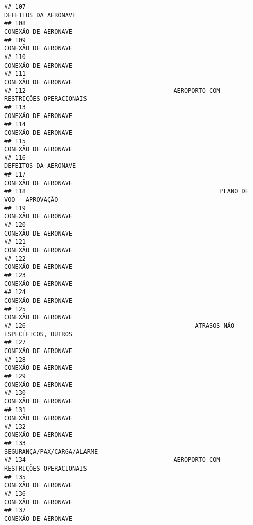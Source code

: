 \documentclass[
]{article}
\begin{document}
\begin{verbatim}
## 107                                                          DEFEITOS DA AERONAVE
## 108                                                           CONEXÃO DE AERONAVE
## 109                                                           CONEXÃO DE AERONAVE
## 110                                                           CONEXÃO DE AERONAVE
## 111                                                           CONEXÃO DE AERONAVE
## 112                                         AEROPORTO COM RESTRIÇÕES OPERACIONAIS
## 113                                                           CONEXÃO DE AERONAVE
## 114                                                           CONEXÃO DE AERONAVE
## 115                                                           CONEXÃO DE AERONAVE
## 116                                                          DEFEITOS DA AERONAVE
## 117                                                           CONEXÃO DE AERONAVE
## 118                                                      PLANO DE VOO - APROVAÇÃO
## 119                                                           CONEXÃO DE AERONAVE
## 120                                                           CONEXÃO DE AERONAVE
## 121                                                           CONEXÃO DE AERONAVE
## 122                                                           CONEXÃO DE AERONAVE
## 123                                                           CONEXÃO DE AERONAVE
## 124                                                           CONEXÃO DE AERONAVE
## 125                                                           CONEXÃO DE AERONAVE
## 126                                               ATRASOS NÃO ESPECÍFICOS, OUTROS
## 127                                                           CONEXÃO DE AERONAVE
## 128                                                           CONEXÃO DE AERONAVE
## 129                                                           CONEXÃO DE AERONAVE
## 130                                                           CONEXÃO DE AERONAVE
## 131                                                           CONEXÃO DE AERONAVE
## 132                                                           CONEXÃO DE AERONAVE
## 133                                                    SEGURANÇA/PAX/CARGA/ALARME
## 134                                         AEROPORTO COM RESTRIÇÕES OPERACIONAIS
## 135                                                           CONEXÃO DE AERONAVE
## 136                                                           CONEXÃO DE AERONAVE
## 137                                                           CONEXÃO DE AERONAVE

\end{verbatim}
\end{document}
